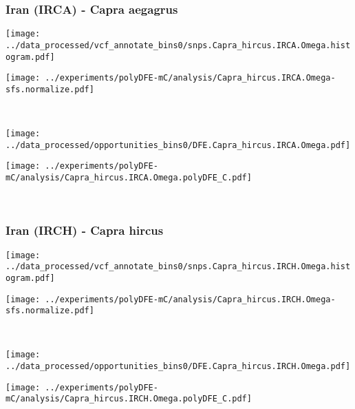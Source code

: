 \subsubsection{Iran (IRCA) - Capra aegagrus}

\begin{minipage}{0.49\linewidth}
    \texttt{[image: ../data\_processed/vcf\_annotate\_bins0/snps.Capra\_hircus.IRCA.Omega.histogram.pdf]}
\end{minipage}
\begin{minipage}{0.49\linewidth}
    \texttt{[image: ../experiments/polyDFE-mC/analysis/Capra\_hircus.IRCA.Omega-sfs.normalize.pdf]}
\end{minipage}
\\
\begin{minipage}{0.49\linewidth}
    \texttt{[image: ../data\_processed/opportunities\_bins0/DFE.Capra\_hircus.IRCA.Omega.pdf]}
\end{minipage}
\begin{minipage}{0.49\linewidth}
    \texttt{[image: ../experiments/polyDFE-mC/analysis/Capra\_hircus.IRCA.Omega.polyDFE\_C.pdf]}
\end{minipage}
\\

\subsubsection{Iran (IRCH) - Capra hircus}

\begin{minipage}{0.49\linewidth}
    \texttt{[image: ../data\_processed/vcf\_annotate\_bins0/snps.Capra\_hircus.IRCH.Omega.histogram.pdf]}
\end{minipage}
\begin{minipage}{0.49\linewidth}
    \texttt{[image: ../experiments/polyDFE-mC/analysis/Capra\_hircus.IRCH.Omega-sfs.normalize.pdf]}
\end{minipage}
\\
\begin{minipage}{0.49\linewidth}
    \texttt{[image: ../data\_processed/opportunities\_bins0/DFE.Capra\_hircus.IRCH.Omega.pdf]}
\end{minipage}
\begin{minipage}{0.49\linewidth}
    \texttt{[image: ../experiments/polyDFE-mC/analysis/Capra\_hircus.IRCH.Omega.polyDFE\_C.pdf]}
\end{minipage}
\\

